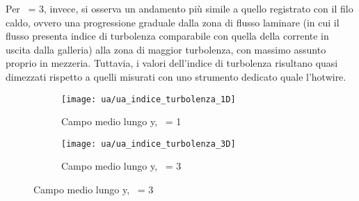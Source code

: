\documentclass{article} %
\newcommand{\xd}{\nicefrac{\textrm{x}}{\textrm{D}}\ }
\begin{document}
Per \xd = 3, invece, si osserva un andamento più simile a quello registrato con il filo caldo, ovvero una progressione graduale dalla zona di flusso laminare (in cui il flusso presenta indice di turbolenza comparabile con quella della corrente in uscita dalla galleria) alla zona di maggior turbolenza, con massimo assunto proprio in mezzeria. Tuttavia, i valori dell'indice di turbolenza risultano quasi dimezzati rispetto a quelli misurati con uno strumento dedicato quale l'hotwire.
\begin{figure}[hb!]
	\centering
	\begin{subfigure}{0.35\textwidth}
		\texttt{[image: ua/ua\_indice\_turbolenza\_1D]}
		\caption{Campo medio lungo y, \xd = 1}
		\label{ua_indice_1D}
	\end{subfigure}\qquad
	\begin{subfigure}{0.35\textwidth}
		\texttt{[image: ua/ua\_indice\_turbolenza\_3D]}
		\caption{Campo medio lungo y, \xd = 3}
		\label{ua_indice_3D}
	\end{subfigure}
\end{figure}
\clearpage
\end{document}
